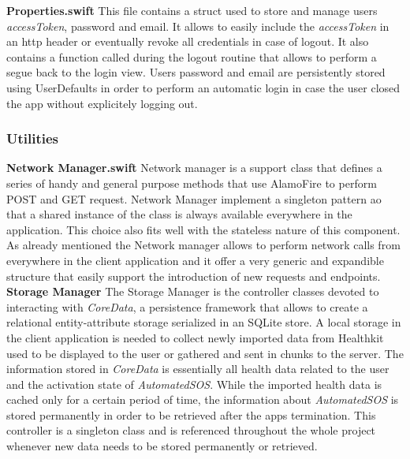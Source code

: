\documentclass[titlepage]{article}
\begin{document}
	\newline
	\noindent
	{\bf Properties.swift} \newline
	This file contains a struct used to store and manage user\textsc{}s {\it accessToken}, password and email. It allows to easily include the {\it accessToken} in an http header or eventually revoke all credentials in case of logout. It also contains a function called during the logout routine that allows to perform a segue back to the login view. User\textsc{}s password and email are persistently stored using UserDefaults in order to perform an automatic login in case the user closed the app without explicitely logging out.
	
	
	
	
	\subsubsection{Utilities}
	{\bf Network Manager.swift} \newline
	Network manager is a support class that defines a series of handy and general purpose methods that use AlamoFire to perform POST and GET request. Network Manager implement a singleton pattern ao that a shared instance of the class is always available everywhere in the application. This choice also fits well with the stateless nature of this component. As already mentioned the Network manager allows to perform network calls from everywhere in the client application and it offer a very generic and expandible structure that easily support the introduction of new requests and  endpoints. \newline
	\newline
	\noindent
	{\bf Storage Manager} \newline
	The Storage Manager is the controller classes devoted to interacting with {\it CoreData}, a persistence framework that allows to create a relational entity-attribute storage serialized in an SQLite store. A local storage in the client application is needed to collect newly imported data from Healthkit used to be displayed to the user or gathered and sent in chunks to the server. The information stored in {\it CoreData} is essentially all health data related to the user and the activation state of {\it AutomatedSOS}. While the imported health data is cached only for a certain period of time, the information about {\it AutomatedSOS} is stored permanently in order to be retrieved after the app\textsc{}s termination.
	This controller is a singleton class and is referenced throughout the whole project whenever new data needs to be stored permanently or retrieved. \newline
\end{document}
